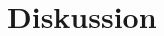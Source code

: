 \newpage
\section{Diskussion}
	\label{sec:diskussion}

\begin{thebibliography}{9}
	
\end{thebibliography}